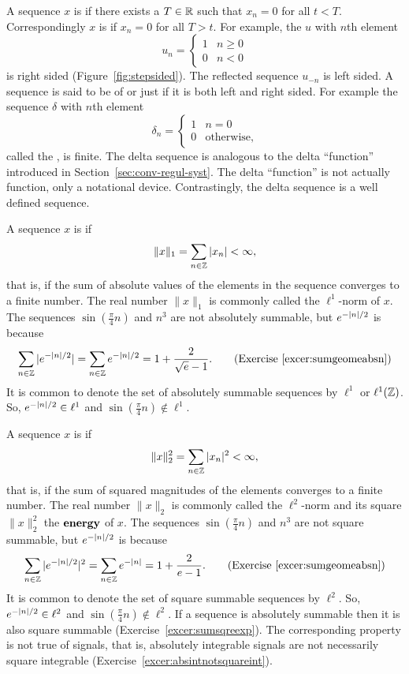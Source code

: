 A sequence $x$ is  if there exists a $T \in {\mathbb R}$ such that $x_n = 0$ for all $t < T$.  Correspondingly $x$ is  if $x_n = 0$ for all $T > t$.  For example, the  $u$ with $n$th element 
\begin{equation} \label{eq:stepsequence}
u_n = \begin{cases} 
1 & n \geq 0 \\
0 & n < 0 
\end{cases}
\end{equation}
is right sided  (Figure~\ref{fig:stepsided}).  The reflected sequence $u_{-n}$ is left sided.  A sequence is said to be of  or just  if it is both left and right sided.  For example the sequence $\delta$ with $n$th element 
\begin{equation} \label{eq:deltasequence}
\delta_n = \begin{cases}
1 & n = 0 \\
0 & \text{otherwise},
\end{cases}
\end{equation}
called the , is finite.  The delta sequence is analogous to the delta ``function'' introduced in Section~\ref{sec:conv-regul-syst}.  The delta ``function'' is not actually function, only a notational device.  Contrastingly, the delta sequence is a well defined sequence.

A sequence $x$ is  if
\[
\|x\|_1 = \sum_{n \in {\mathbb Z}} \vert x_n \vert < \infty,
\]
that is, if the sum of absolute values of the elements in the sequence converges to a finite number.  The real number $\|x\|_1$ is commonly called the $\ell^1$-norm of $x$.  The sequences $\sin(\tfrac{\pi}{4} n)$ and $n^3$ are not absolutely summable, but $e^{-\left\vert n \right\vert/2}$ is because
\[
\sum_{n \in {\mathbb Z}} \vert e^{-\vert n \vert/2} \vert = \sum_{n \in {\mathbb Z}} e^{-\vert n \vert/2} = 1 + \frac{2}{\sqrt{e} - 1}. \qquad \text{(Exercise~\ref{excer:sumgeomeabsn})}
\]
It is common to denote the set of absolutely summable sequences by $\ell^1$ or $\ell^1({\mathbb Z})$.  So, $e^{-\vert n \vert/2} \in \ell^1$ and $\sin(\tfrac{\pi}{4} n) \notin \ell^1$.

A sequence $x$ is  if
\[
\|x\|_2^2 = \sum_{n \in {\mathbb Z}} \vert x_n \vert^2 < \infty,
\]
that is, if the sum of squared magnitudes of the elements converges to a finite number.  The real number $\|x\|_2$ is commonly called the $\ell^2$-norm and its square $\|x\|^2_2$ the $\textbf{energy}$ of $x$.  The sequences $\sin(\tfrac{\pi}{4} n)$ and $n^3$ are not square summable, but $e^{-\left\vert n \right\vert/2}$ is because 
\[
\sum_{n \in {\mathbb Z}} \vert e^{-\vert n \vert/2} \vert^2 = \sum_{n \in {\mathbb Z}} e^{-\left\vert n \right\vert} = 1 + \frac{2}{e - 1}. \qquad \text{(Exercise~\ref{excer:sumgeomeabsn})}
\]
It is common to denote the set of square summable sequences by $\ell^2$.  So, $e^{-\vert n \vert/2} \in \ell^2$ and $\sin(\tfrac{\pi}{4} n) \notin \ell^2$.  If a sequence is absolutely summable then it is also square summable (Exercise~\ref{excer:sumsqreexp}).  The corresponding property is not true of signals, that is, absolutely integrable signals are not necessarily square integrable (Exercise~\ref{excer:absintnotsquareint}).


